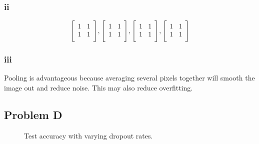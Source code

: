 \documentclass[12pt]{article} %
\begin{document}
\subsubsection{ii}
$$
\begin{bmatrix}
    1 & 1  \\
    1 & 1  \\
\end{bmatrix}
,
\begin{bmatrix}
    1 & 1  \\
    1 & 1  \\
\end{bmatrix}
,
\begin{bmatrix}
    1 & 1  \\
    1 & 1  \\
\end{bmatrix}
,
\begin{bmatrix}
    1 & 1  \\
    1 & 1  \\
\end{bmatrix}
$$
\subsubsection{iii}
Pooling is advantageous because averaging several pixels together will smooth the image out and reduce noise. This may also reduce overfitting.

\subsection{Problem D}

\begin{figure}[H]
	\vspace{-10mm}
	\caption{Test accuracy with varying dropout rates.}
\end{figure}
\end{document}
